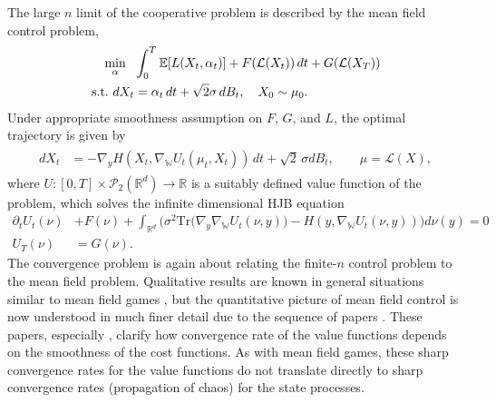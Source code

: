 \documentclass[11pt,reqno]{amsart}
\numberwithin{equation}{section}
\theoremstyle{definition}
\def\E{{\mathbb E}}
\def\R{{\mathbb R}}
\def\L{{\mathcal L}}
\def\Law{\mathcal{L}}
\def\tr{\mathrm{Tr}}
\newcommand{\wgrad}{\nabla_{\W}}
\newcommand{\W}{\mathbb W}
\begin{document}
The large $n$ limit of the cooperative problem is described by the mean field control problem,
\begin{align}
\label{eq: mean field control}
   \begin{split} 
    \min_{\alpha} \ \ &\int_0^T\E[L(X_t,\alpha_t)]+ F(\L(X_t))\,dt+ G(\L(X_T)) \\
    \text{s.t.\,\,} dX_t&= \alpha_t\,dt+\sqrt 2 \sigma \, dB_t, \quad X_0 \sim \mu_0.
\end{split}
\end{align}
Under appropriate smoothness assumption on $F$, $G$, and $L$, the optimal trajectory is given by
\begin{align}
\label{eq: MFC optimal trajectory}
\begin{split}
dX_t&=-\nabla_y H(X_t,\wgrad U_t(\mu_t,X_t))\,dt+\sqrt 2 \, \sigma dB_t, \qquad \mu=\Law(X),
\end{split}
\end{align}
where $U : [0,T] \times \mathcal{P}_2(\R^d) \to \R$ is a suitably defined value function of the problem, which solves the infinite dimensional HJB equation
\begin{align*}
    \partial_t U_t(\nu)&+F(\nu)+\int_{\R^d}\Big(\sigma^2\tr\big( \nabla_y \wgrad U_t(\nu,y)\big) - H(y,\wgrad U_t(\nu,y))\Big)d\nu(y)=0\\
    U_T(\nu)&=G(\nu).
\end{align*}
The convergence problem is again about relating the finite-$n$ control problem to the mean field problem. Qualitative results are known in general situations similar to mean field games \cite{lacker2017limit,djete2022mckean}, but the quantitative picture of mean field control is now understood in much finer detail due to the sequence of papers \cite{cardaliaguet2023algebraic,cardaliaguet2023regularity,DAUDIN2024110660,cardaliaguet2023sharpconvergenceratesmean}. These papers, especially  \cite{DAUDIN2024110660}, clarify how convergence rate of the value functions depends on the smoothness of the cost functions. As with mean field games, these sharp convergence rates for the value functions do not translate directly to sharp convergence rates (propagation of chaos) for the state processes.
\end{document}
